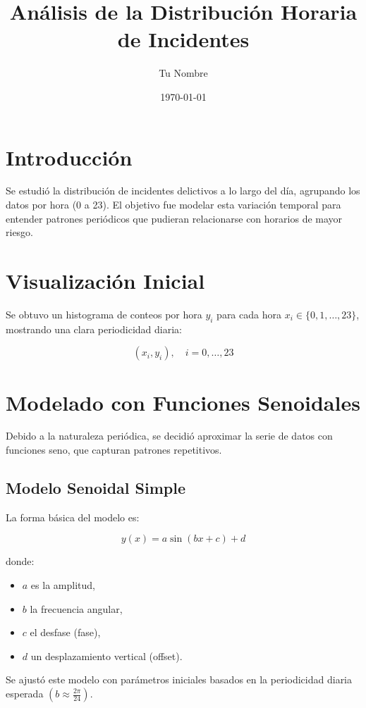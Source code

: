 \documentclass[a4paper,12pt]{article}
\title{Análisis de la Distribución Horaria de Incidentes}
\author{Tu Nombre}
\date{\today}
\begin{document}
\maketitle

\section{Introducción}

Se estudió la distribución de incidentes delictivos a lo largo del día, agrupando los datos por hora (0 a 23). El objetivo fue modelar esta variación temporal para entender patrones periódicos que pudieran relacionarse con horarios de mayor riesgo.

\section{Visualización Inicial}

Se obtuvo un histograma de conteos por hora \( y_i \) para cada hora \( x_i \in \{0,1,\ldots,23\} \), mostrando una clara periodicidad diaria:

\[
(x_i, y_i), \quad i=0, \ldots, 23
\]

\section{Modelado con Funciones Senoidales}

Debido a la naturaleza periódica, se decidió aproximar la serie de datos con funciones seno, que capturan patrones repetitivos.

\subsection{Modelo Senoidal Simple}

La forma básica del modelo es:

\[
y(x) = a \sin(bx + c) + d
\]

donde:

\begin{itemize}
    \item \( a \) es la amplitud,
    \item \( b \) la frecuencia angular,
    \item \( c \) el desfase (fase),
    \item \( d \) un desplazamiento vertical (offset).
\end{itemize}

Se ajustó este modelo con parámetros iniciales basados en la periodicidad diaria esperada \( \left(b \approx \frac{2\pi}{24}\right) \).
\end{document}

